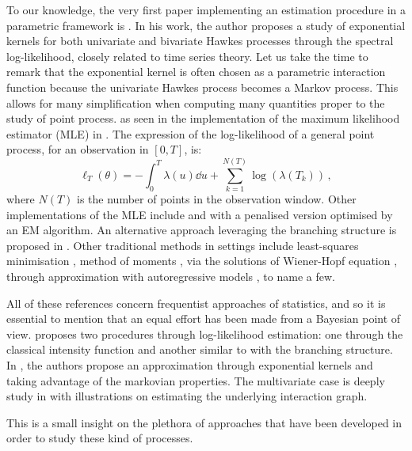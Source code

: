 
    To our knowledge, the very first paper implementing an estimation procedure in a parametric framework is \textcite{Adamopoulos1976}.
    In his work, the author proposes a study of exponential kernels for both univariate and bivariate Hawkes processes through the spectral log-likelihood,
    closely related to time series theory.
    Let us take the time to remark that the exponential kernel is often chosen as a parametric interaction function because the univariate Hawkes process becomes a Markov process.
    This allows for many simplification when computing many quantities proper to the study of point process.
    as seen in the implementation of the maximum likelihood estimator (MLE) in \textcite{Ozaki1979}.
    The expression of the log-likelihood of a general point process, for an observation in $[0, T]$, is:
    \[\ell_T(\theta) = - \int_{0}^{T}{\lambda(u)\dd u} + \sum_{k=1}^{N(T)}{\log(\lambda(T_k))}\,,\]
    where $N(T)$ is the number of points in the observation window. 
    Other implementations of the MLE include \textcite{Ogata1988, Guo2018} and \textcite{Lewis2011} with a penalised version optimised by an EM algorithm.
    An alternative approach leveraging the branching structure is proposed in \textcite{Veen2008}.
    Other traditional methods in settings include least-squares minimisation \parencite{Reynaud2010, Eichler2016, Kirchner2017}, 
    method of moments \parencite{DaFonseca2013},
    via the solutions of Wiener-Hopf equation \parencite{Bacry2016},
    through approximation with autoregressive models \parencite{Kirchner2017},
    to name a few.
    
    All of these references concern frequentist approaches of statistics, 
    and so it is essential to mention that an equal effort has been made from a Bayesian point of view.
    \textcite{Rasmussen2013} proposes two procedures through log-likelihood estimation: 
    one through the classical intensity function and another similar to \textcite{Veen2008} with the branching structure.
    In \textcite{Lemonnier2014}, the authors propose an approximation through exponential kernels and taking advantage of the markovian properties.
    The multivariate case is deeply study in \textcite{Donnet2020} with illustrations on estimating the underlying interaction graph.
    
    This is a small insight on the plethora of approaches that have been developed in order to study these kind of processes.
    

